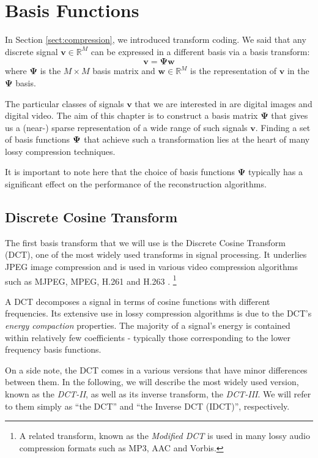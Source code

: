 \chapter{Basis Functions}
\label{ch:dwt}

In Section \ref{sect:compression}, we introduced transform coding.
We said that any discrete signal $\bm v \in \mathbb{R}^M$ can be expressed in a different basis via a basis transform:
\begin{equation*}
  \bm v = \bm\Psi\bm w
\end{equation*}
where $\bm\Psi$ is the $M\times M$ basis matrix and $\bm w \in\mathbb{R}^M$ is the representation of $\bm v$ in the $\bm\Psi$ basis.

The particular classes of signals $\bm v$ that we are interested in are digital images and digital video.
The aim of this chapter is to construct a basis matrix $\bm\Psi$ that gives us a (near-) sparse representation of a wide range of such signals $\bm v$.
Finding a set of basis functions $\boldsymbol\Psi$ that achieve such a transformation lies at the heart of many lossy compression techniques.

It is important to note here that the choice of basis functions $\bm \Psi$ typically has a significant effect on the performance of the reconstruction algorithms.

\section{Discrete Cosine Transform}
The first basis transform that we will use is the Discrete Cosine Transform (DCT), one of the most widely used transforms in signal processing.
It underlies JPEG image compression and is used in various video compression algorithms such as MJPEG, MPEG, H.261 and H.263 \cite{zeng2013}.
\footnote{A related transform, known as the \emph{Modified DCT} is used in many lossy audio compression formats such as MP3, AAC and Vorbis.}

A DCT decomposes a signal in terms of cosine functions with different frequencies.
Its extensive use in lossy compression algorithms is due to the DCT's \emph{energy compaction} properties.
The majority of a signal's energy is contained within relatively few coefficients - typically those corresponding to the lower frequency basis functions.

On a side note, the DCT comes in a various versions that have minor differences between them.
In the following, we will describe the most widely used version, known as the \emph{DCT-II}, as well as its inverse transform, the \emph{DCT-III}.
We will refer to them simply as ``the DCT'' and ``the Inverse DCT (IDCT)'', respectively.

